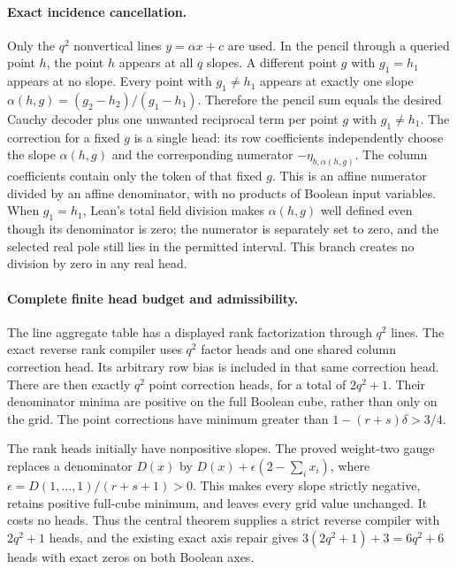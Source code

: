 \documentclass[11pt]{article}
\begin{document}
\paragraph{Exact incidence cancellation.}
Only the $q^2$ nonvertical lines $y=\alpha x+c$ are used. In the pencil
through a queried point $h$, the point $h$ appears at all $q$ slopes. A
different point $g$ with $g_1=h_1$ appears at no slope. Every point with
$g_1\ne h_1$ appears at exactly one slope
$\alpha(h,g)=(g_2-h_2)/(g_1-h_1)$. Therefore the pencil sum equals the
desired Cauchy decoder plus one unwanted reciprocal term per point $g$
with $g_1\ne h_1$. The correction for a fixed $g$ is a single head:
its row coefficients independently choose the slope $\alpha(h,g)$ and
the corresponding numerator $-\eta_{b,\alpha(h,g)}$.
The column coefficients contain only the token of that fixed $g$.
This is an affine numerator divided by an affine denominator, with no
products of Boolean input variables. When $g_1=h_1$, Lean's total field
division makes $\alpha(h,g)$ well defined even though its denominator is
zero; the numerator is separately set to zero, and the selected real pole
still lies in the permitted interval. This branch creates no division by
zero in any real head.

\paragraph{Complete finite head budget and admissibility.}
The line aggregate table has a displayed rank factorization through $q^2$
lines. The exact reverse rank compiler uses $q^2$ factor heads and one
shared column correction head. Its arbitrary row bias is included in that
same correction head. There are then exactly $q^2$ point correction heads,
for a total of $2q^2+1$. Their denominator minima are positive on the full
Boolean cube, rather than only on the grid. The point corrections have
minimum greater than $1-(r+s)\delta>3/4$.

The rank heads initially have nonpositive slopes. The proved weight-two
gauge replaces a denominator $D(x)$ by
$D(x)+\epsilon(2-\sum_i x_i)$, where
$\epsilon=D(1,\ldots,1)/(r+s+1)>0$. This makes every slope strictly
negative, retains positive full-cube minimum, and leaves every grid value
unchanged. It costs no heads. Thus the central theorem supplies a strict
reverse compiler with $2q^2+1$ heads, and the existing exact axis repair
gives $3(2q^2+1)+3=6q^2+6$ heads with exact zeros on both Boolean axes.
\end{document}
